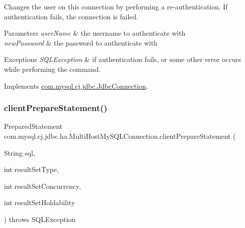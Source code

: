 Changes the user on this connection by performing a re-\/authentication. If authentication fails, the connection is failed.


\begin{DoxyParams}{Parameters}
{\em user\+Name} & the username to authenticate with \\
\hline
{\em new\+Password} & the password to authenticate with \\
\hline
\end{DoxyParams}

\begin{DoxyExceptions}{Exceptions}
{\em S\+Q\+L\+Exception} & if authentication fails, or some other error occurs while performing the command. \\
\hline
\end{DoxyExceptions}


Implements \mbox{\hyperlink{interfacecom_1_1mysql_1_1cj_1_1jdbc_1_1_jdbc_connection_aed0496e0f2c1236f2784f92b45a482ef}{com.\+mysql.\+cj.\+jdbc.\+Jdbc\+Connection}}.

\mbox{\label{classcom_1_1mysql_1_1cj_1_1jdbc_1_1ha_1_1_multi_host_my_s_q_l_connection_a90d99874278a283359f65712794b4524}} 
\subsubsection{\texorpdfstring{client\+Prepare\+Statement()}{clientPrepareStatement()}\hspace{0.1cm}{\footnotesize\ttfamily [1/6]}}
{\footnotesize\ttfamily Prepared\+Statement com.\+mysql.\+cj.\+jdbc.\+ha.\+Multi\+Host\+My\+S\+Q\+L\+Connection.\+client\+Prepare\+Statement (\begin{DoxyParamCaption}\item[{String}]{sql,  }\item[{int}]{result\+Set\+Type,  }\item[{int}]{result\+Set\+Concurrency,  }\item[{int}]{result\+Set\+Holdability }\end{DoxyParamCaption}) throws S\+Q\+L\+Exception}

